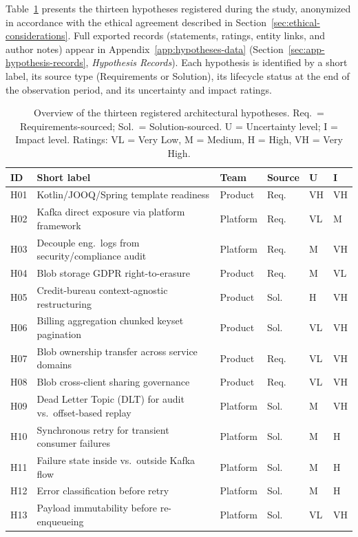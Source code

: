 Table~\ref{tab:hypotheses-overview} presents the thirteen hypotheses registered
during the study, anonymized in accordance with the ethical agreement described
in Section~\ref{sec:ethical-considerations}. Full exported records (statements,
ratings, entity links, and author notes) appear in Appendix~\ref{app:hypotheses-data}
(Section~\ref{sec:app-hypothesis-records}, \textit{Hypothesis Records}). Each hypothesis is identified by a
short label, its source type (Requirements or Solution), its lifecycle status
at the end of the observation period, and its uncertainty and impact ratings.

\begin{table}[htbp]
\caption{Overview of the thirteen registered architectural hypotheses.
  Req.\ = Requirements-sourced; Sol.\ = Solution-sourced.
  U = Uncertainty level; I = Impact level.
  Ratings: VL = Very Low, M = Medium, H = High, VH = Very High.}
\label{tab:hypotheses-overview}
\centering\small
\begin{tabular}{llllll}
\toprule
\textbf{ID} & \textbf{Short label} & \textbf{Team} & \textbf{Source} &
\textbf{U} & \textbf{I} \\
\midrule
H01 & Kotlin/JOOQ/Spring template readiness & Product  & Req. & VH & VH \\
H02 & Kafka direct exposure via platform framework & Platform & Req. & VL & M  \\
H03 & Decouple eng.\ logs from security/compliance audit & Platform & Req. & M  & VH \\
H04 & Blob storage GDPR right-to-erasure & Product  & Req. & M  & VL \\
H05 & Credit-bureau context-agnostic restructuring & Product  & Sol. & H  & VH \\
H06 & Billing aggregation chunked keyset pagination & Product  & Sol. & VL & VH \\
H07 & Blob ownership transfer across service domains & Product  & Req. & VL & VH \\
H08 & Blob cross-client sharing governance & Product  & Req. & VL & VH \\
H09 & Dead Letter Topic (DLT) for audit vs.\ offset-based replay & Platform & Sol. & M  & VH \\
H10 & Synchronous retry for transient consumer failures & Platform & Sol. & M  & H  \\
H11 & Failure state inside vs.\ outside Kafka flow & Platform & Sol. & M  & H  \\
H12 & Error classification before retry & Platform & Sol. & M  & H  \\
H13 & Payload immutability before re-enqueueing & Platform & Sol. & VL & VH \\
\bottomrule
\end{tabular}
\end{table}

